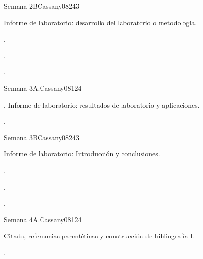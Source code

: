 \begin{syllabus}
\begin{unit}{Semana 2B}{}{Cassany08}{24}{3}
   \begin{topics}
      \item Informe de laboratorio: desarrollo del laboratorio o metodología.
   \end{topics}

   \begin{learningoutcomes}
      \item . 
      \item .
      \item . 
      \end{learningoutcomes}
\end{unit}

\begin{unit}{Semana 3A.}{}{Cassany08}{12}{4}
   \begin{topics}
      \item . Informe de laboratorio: resultados de laboratorio y aplicaciones. 
   \end{topics}
   \begin{learningoutcomes}
      \item . 
   \end{learningoutcomes}
\end{unit}

\begin{unit}{Semana 3B}{}{Cassany08}{24}{3}
   \begin{topics}
      \item Informe de laboratorio: Introducción y conclusiones. 
   \end{topics}

   \begin{learningoutcomes}
      \item . 
      \item .
      \item . 
      \end{learningoutcomes}
\end{unit}

\begin{unit}{Semana 4A.}{}{Cassany08}{12}{4}
   \begin{topics}
      \item Citado, referencias parentéticas y construcción de bibliografía I. 
   \end{topics}
   \begin{learningoutcomes}
      \item . 
   \end{learningoutcomes}
\end{unit}


\end{syllabus}
